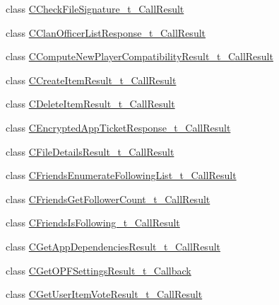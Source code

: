 \begin{DoxyCompactItemize}
class \hyperlink{class_valve_1_1_steamworks_1_1_c_check_file_signature__t___call_result}{C\+Check\+File\+Signature\+\_\+t\+\_\+\+Call\+Result}
\item 
class \hyperlink{class_valve_1_1_steamworks_1_1_c_clan_officer_list_response__t___call_result}{C\+Clan\+Officer\+List\+Response\+\_\+t\+\_\+\+Call\+Result}
\item 
class \hyperlink{class_valve_1_1_steamworks_1_1_c_compute_new_player_compatibility_result__t___call_result}{C\+Compute\+New\+Player\+Compatibility\+Result\+\_\+t\+\_\+\+Call\+Result}
\item 
class \hyperlink{class_valve_1_1_steamworks_1_1_c_create_item_result__t___call_result}{C\+Create\+Item\+Result\+\_\+t\+\_\+\+Call\+Result}
\item 
class \hyperlink{class_valve_1_1_steamworks_1_1_c_delete_item_result__t___call_result}{C\+Delete\+Item\+Result\+\_\+t\+\_\+\+Call\+Result}
\item 
class \hyperlink{class_valve_1_1_steamworks_1_1_c_encrypted_app_ticket_response__t___call_result}{C\+Encrypted\+App\+Ticket\+Response\+\_\+t\+\_\+\+Call\+Result}
\item 
class \hyperlink{class_valve_1_1_steamworks_1_1_c_file_details_result__t___call_result}{C\+File\+Details\+Result\+\_\+t\+\_\+\+Call\+Result}
\item 
class \hyperlink{class_valve_1_1_steamworks_1_1_c_friends_enumerate_following_list__t___call_result}{C\+Friends\+Enumerate\+Following\+List\+\_\+t\+\_\+\+Call\+Result}
\item 
class \hyperlink{class_valve_1_1_steamworks_1_1_c_friends_get_follower_count__t___call_result}{C\+Friends\+Get\+Follower\+Count\+\_\+t\+\_\+\+Call\+Result}
\item 
class \hyperlink{class_valve_1_1_steamworks_1_1_c_friends_is_following__t___call_result}{C\+Friends\+Is\+Following\+\_\+t\+\_\+\+Call\+Result}
\item 
class \hyperlink{class_valve_1_1_steamworks_1_1_c_get_app_dependencies_result__t___call_result}{C\+Get\+App\+Dependencies\+Result\+\_\+t\+\_\+\+Call\+Result}
\item 
class \hyperlink{class_valve_1_1_steamworks_1_1_c_get_o_p_f_settings_result__t___callback}{C\+Get\+O\+P\+F\+Settings\+Result\+\_\+t\+\_\+\+Callback}
\item 
class \hyperlink{class_valve_1_1_steamworks_1_1_c_get_user_item_vote_result__t___call_result}{C\+Get\+User\+Item\+Vote\+Result\+\_\+t\+\_\+\+Call\+Result}
\item 

\end{DoxyCompactItemize}

